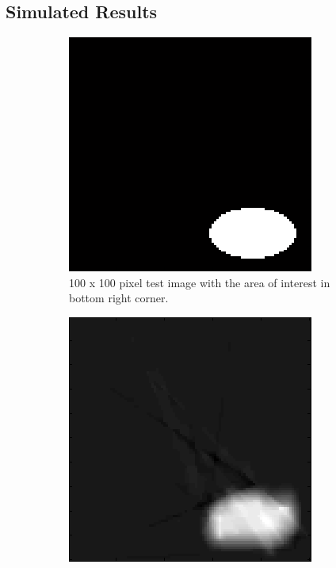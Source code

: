 \documentclass[english]{article}\usepackage[]{graphicx}\usepackage[]{color}
\begin{document}
\subsection{Simulated Results}
\begin{figure}
\centering
\begin{subfigure}{.22\textwidth}
  \centering
    \includegraphics[width=1\linewidth]{figures/adaptiveresultoriginal}
  \caption{100 x 100 pixel test image with the area of interest in bottom right corner.}
  \vspace{0pt}
  \label{fig:adp_sim_orig}
\end{subfigure}%
\hspace{10pt}
\begin{subfigure}{.22\textwidth}
  \centering
    \includegraphics[width=1\linewidth]{figures/nonadaptiveresultrec}

\end{subfigure}
\end{figure}
\end{document}
